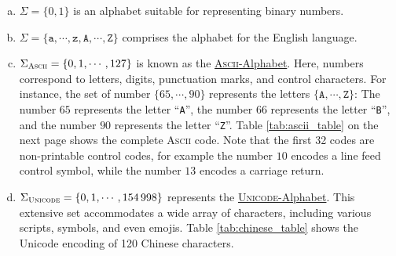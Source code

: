 \examplesEng
\begin{enumerate}[(a)]
\item \( \Sigma = \{ 0, 1 \} \) is an alphabet suitable for representing binary numbers.
\item \( \Sigma = \{ \mathtt{a}, \cdots, \mathtt{z}, \mathtt{A}, \cdots, \mathtt{Z} \} \) comprises the alphabet for the English language.
\item \( \Sigma_{\textsc{\scriptsize Ascii}} = \{ 0, 1, \cdots, 127 \} \) is known as the
      \href{http://en.wikipedia.org/wiki/ASCII}{\textsc{Ascii}-Alphabet}.  Here,
      numbers correspond to letters, digits, punctuation marks, and control characters. For instance, the set
      of number \( \{ 65, \cdots, 90 \} \) represents the letters \( \{ \mathtt{A}, \cdots, \mathtt{Z} \} \):
      The number $65$ represents the letter ``\texttt{A}'', the number $66$ represents the letter
      ``\texttt{B}'', and the number $90$ represents the letter ``\texttt{Z}''.
      Table \ref{tab:ascii_table} on the next page shows the complete \textsc{Ascii} code.  Note that the first 32 codes are
      non-printable control codes, for example the number $10$ encodes a line feed control symbol, while the
      number $13$ encodes a carriage return.
      
\item \( \Sigma_{\textsc{\scriptsize Unicode}} = \{ 0, 1, \cdots, 154\,998 \} \) represents the
      \href{https://en.wikipedia.org/wiki/Unicode}{\textsc{Unicode}-Alphabet}. 
      This extensive set accommodates a wide array of characters, including various scripts, symbols, and even
      emojis.  Table \ref{tab:chinese_table} shows the Unicode encoding of 120 Chinese characters.
\eox
\end{enumerate}

